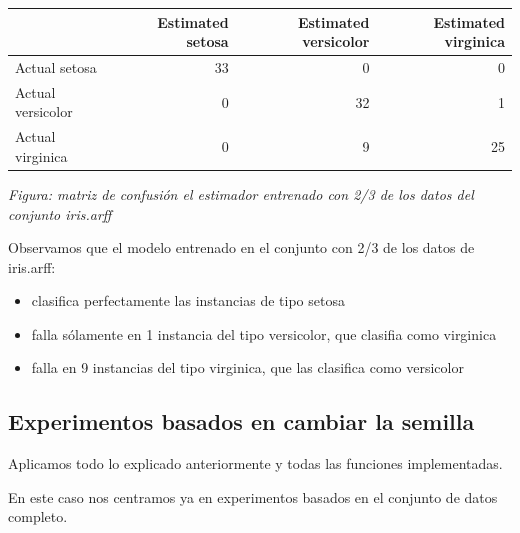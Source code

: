 \documentclass[11pt]{article}
\providecommand{\tightlist}{%
      \setlength{\itemsep}{0pt}\setlength{\parskip}{0pt}}
\begin{document}
            \begin{mdframed}[hidealllines=true,backgroundcolor=green!10]
            
    
    \begin{tabular}{lrrr}
\toprule
{} &  Estimated setosa &  Estimated versicolor &  Estimated virginica \\
\midrule
Actual setosa     &                33 &                     0 &                    0 \\
Actual versicolor &                 0 &                    32 &                    1 \\
Actual virginica  &                 0 &                     9 &                   25 \\
\bottomrule
\end{tabular}

    

            \end{mdframed}
            \endgroup
    \emph{Figura: matriz de confusión el estimador entrenado con 2/3 de los
datos del conjunto iris.arff}

Observamos que el modelo entrenado en el conjunto con 2/3 de los datos
de iris.arff:

\begin{itemize}
\tightlist
\item
  clasifica perfectamente las instancias de tipo setosa
\item
  falla sólamente en 1 instancia del tipo versicolor, que clasifia como
  virginica
\item
  falla en 9 instancias del tipo virginica, que las clasifica como
  versicolor
\end{itemize}

    \subsection{Experimentos basados en cambiar la
semilla}\label{experimentos-basados-en-cambiar-la-semilla}

Aplicamos todo lo explicado anteriormente y todas las funciones
implementadas.

En este caso nos centramos ya en experimentos basados en el conjunto de
datos completo.
\end{document}
